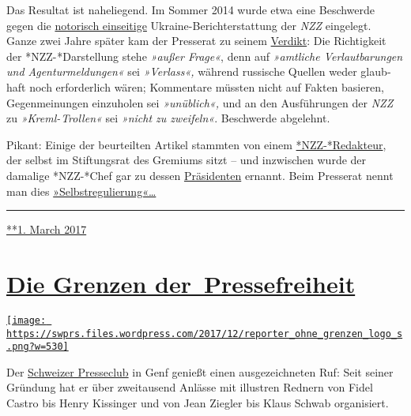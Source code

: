 Das Resultat ist naheliegend. Im Som­mer 2014 wurde etwa eine
Be­schwerde gegen die
\href{https://swprs.org/die-nzz-studie/}{no­to­risch ein­sei­tige}
Ukraine-Bericht­er­stattung der \emph{NZZ} ein­ge­legt. Ganze zwei Jahre
später kam der Presse­rat zu seinem
\href{https://presserat.ch/complaints/wahrheitspflicht-kommentarfreiheit-unterschlagen-wichtiger-informationen-entstellen-von-tatsachen/}{Verdikt}:
Die Rich­tig­keit der *NZZ- *Dar­stel­lung stehe \emph{»außer Frage«},
denn auf \emph{»amt­liche Ver­laut­ba­rungen und Agen­tur­mel­dungen«}
sei \emph{»Verlass«,} während russische Quel­len weder glaub­haf‌t noch
erforderlich wären; Kom­men­tare müss­ten nicht auf Fak­ten ba­sie­ren,
Ge­gen­mei­nungen ein­zu­holen sei \emph{»un­üb­lich«,} und an den
Aus­füh­rungen der \emph{NZZ} zu \emph{»Kreml- Trollen«} sei
\emph{»nicht zu zwei­feln«}. Be­schwerde ab­ge­lehnt.

Pikant: Einige der be­ur­teil­ten Ar­tikel stam­mten von einem
\href{http://www.nzz.ch/international/europa/beschwerde-beim-presserat-kritik-an-nzz-abgewiesen-ld.104814}{*NZZ-*Redak­teur},
der selbst im Stif‌­tungs­rat des Gremiums sitzt -- und inzwischen wurde
der damalige *NZZ-*Chef gar zu dessen
\href{http://www.nzz.ch/schweiz/medien-selbstregulierung-markus-spillmann-wird-praesident-des-presserats-ld.135619}{Prä­si­denten}
ernannt. Beim Presse­rat nennt man dies
\href{https://de.wikipedia.org/wiki/Schweizer_Presserat}{»Selbst­re­gu­lierung«\ldots{}}

\begin{center}\rule{0.5\linewidth}{\linethickness}\end{center}

\href{https://swprs.org/2017/03/01/der-schweizer-presserat/}{**1. March
2017}

\hypertarget{die-grenzen-der-pressefreiheit}{%
\section{\texorpdfstring{\href{https://swprs.org/2017/03/01/die-grenzen-der-pressefreiheit/}{Die
Grenzen
der~Pressefreiheit}}{Die Grenzen der~Pressefreiheit}}\label{die-grenzen-der-pressefreiheit}}

\href{https://swprs.org/2017/03/01/die-grenzen-der-pressefreiheit/}{\texttt{[image: https://swprs.files.wordpress.com/2017/12/reporter\_ohne\_grenzen\_logo\_s.png?w=530]}}

Der \href{http://pressclub.ch/?lang=en}{Schweizer Presseclub} in Genf
genießt einen ausgezeichneten Ruf: Seit seiner Gründung hat er über
zweitausend Anlässe mit illustren Rednern von Fidel Castro bis Henry
Kissinger und von Jean Ziegler bis Klaus Schwab organisiert.

